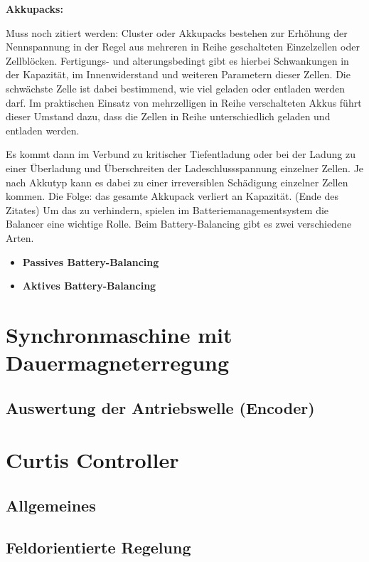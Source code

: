 \textbf{Akkupacks:}

Muss noch zitiert werden: Cluster oder Akkupacks bestehen zur Erhöhung der Nennspannung in der Regel aus mehreren in Reihe geschalteten Einzelzellen oder Zellblöcken. Fertigungs- und alterungsbedingt gibt es hierbei Schwankungen in der Kapazität, im Innenwiderstand und weiteren Parametern dieser Zellen. Die schwächste Zelle ist dabei bestimmend, wie viel geladen oder entladen werden darf. Im praktischen Einsatz von mehrzelligen in Reihe verschalteten Akkus führt dieser Umstand dazu, dass die Zellen in Reihe unterschiedlich geladen und entladen werden.

Es kommt dann im Verbund zu kritischer Tiefentladung oder bei der Ladung zu einer Überladung und Überschreiten der Ladeschlussspannung einzelner Zellen. Je nach Akkutyp kann es dabei zu einer irreversiblen Schädigung einzelner Zellen kommen. Die Folge: das gesamte Akkupack verliert an Kapazität. (Ende des Zitates)
Um das zu verhindern, spielen im Batteriemanagementsystem die Balancer eine wichtige Rolle. Beim Battery-Balancing gibt es zwei verschiedene Arten. 
\begin{itemize}
\item \textbf{Passives Battery-Balancing} \medskip\\
\item \textbf{Aktives Battery-Balancing} \medskip\\
\end{itemize}


\section{Synchronmaschine mit Dauermagneterregung}
\subsection{Auswertung der Antriebswelle (Encoder)}

\section{Curtis Controller}
\subsection{Allgemeines}
\subsection{Feldorientierte Regelung}

